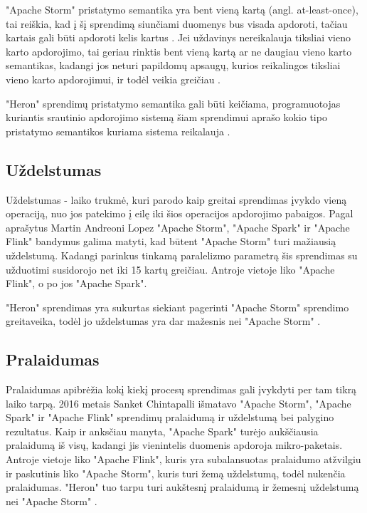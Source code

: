 \documentclass{VUMIFPSbakalaurinis}
\begin{document}
"Apache Storm" pristatymo semantika yra bent vieną kartą (angl. at-least-once), tai reiškia, kad į šį sprendimą siunčiami duomenys bus visada apdoroti, tačiau kartais gali būti apdoroti kelis kartus \cite{prithi20}. Jei uždavinys nereikalauja tiksliai vieno karto apdorojimo, tai geriau rinktis bent vieną kartą ar ne daugiau vieno karto semantikas, kadangi jos neturi papildomų apsaugų, kurios reikalingos tiksliai vieno karto apdorojimui, ir todėl veikia greičiau \cite{zhang20}. \par

"Heron" sprendimų pristatymo semantika gali būti keičiama, programuotojas kuriantis srautinio apdorojimo sistemą šiam sprendimui aprašo kokio tipo pristatymo semantikos kuriama sistema reikalauja \cite{delivery-semantics}.

\subsection{Uždelstumas}

Uždelstumas - laiko trukmė, kuri parodo kaip greitai sprendimas įvykdo vieną operaciją, nuo jos patekimo į eilę iki šios operacijos apdorojimo pabaigos. Pagal \cite{Lopez2016APC} aprašytus Martin Andreoni Lopez "Apache Storm", "Apache Spark" ir "Apache Flink" bandymus galima matyti, kad būtent "Apache Storm" turi mažiausią uždelstumą. Kadangi parinkus tinkamą paralelizmo parametrą šis sprendimas su užduotimi susidorojo net iki 15 kartų greičiau. Antroje vietoje liko "Apache Flink", o po jos "Apache Spark". \par

"Heron" sprendimas yra sukurtas siekiant pagerinti "Apache Storm" sprendimo greitaveika, todėl jo uždelstumas yra dar mažesnis nei "Apache Storm" \cite{Kulkarni:2015:THS:2723372.2742788}.

\subsection{Pralaidumas}

Pralaidumas apibrėžia kokį kiekį procesų sprendimas gali įvykdyti per tam tikrą laiko tarpą. 2016 metais Sanket Chintapalli išmatavo "Apache Storm", "Apache Spark" ir "Apache Flink" sprendimų pralaidumą ir uždelstumą bei palygino rezultatus. Kaip ir anksčiau manyta, "Apache Spark" turėjo aukščiausia pralaidumą iš visų, kadangi jis vienintelis duomenis apdoroja mikro-paketais\cite{chintapalli2016benchmarking}. Antroje vietoje liko "Apache Flink", kuris yra subalansuotas pralaidumo atžvilgiu ir paskutinis liko "Apache Storm", kuris turi žemą uždelstumą, todėl nukenčia pralaidumas. "Heron" tuo tarpu turi aukštesnį pralaidumą ir žemesnį uždelstumą nei "Apache Storm" \cite{TwitterHeron}. 
\end{document}
